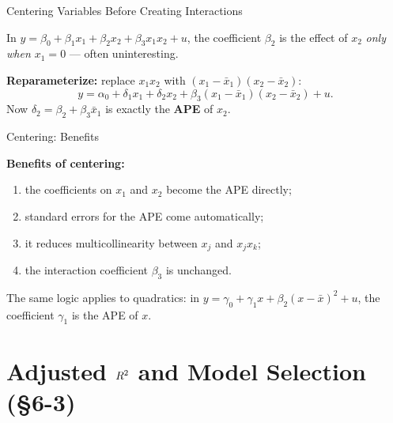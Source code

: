 \documentclass[aspectratio=169, 12pt]{beamer}
\begin{document}
\begin{frame}{Centering Variables Before Creating Interactions}

  In $y = \beta_0 + \beta_1 x_1 + \beta_2 x_2 + \beta_3 x_1 x_2 + u$, the coefficient
  $\beta_2$ is the effect of $x_2$ \emph{only when $x_1 = 0$} --- often uninteresting.

  \medskip

  \textbf{Reparameterize:} replace $x_1 x_2$ with $(x_1 - \bar{x}_1)(x_2 - \bar{x}_2)$:
  \[
    y = \alpha_0 + \delta_1 x_1 + \delta_2 x_2
      + \beta_3 (x_1 - \bar{x}_1)(x_2 - \bar{x}_2) + u .
  \]
  Now $\delta_2 = \beta_2 + \beta_3 \bar{x}_1$ is exactly the \textbf{APE} of $x_2$.

\end{frame}

\begin{frame}{Centering: Benefits}

  \begin{keybox}
    \textbf{Benefits of centering:}
    \begin{enumerate}
      \item the coefficients on $x_1$ and $x_2$ become the APE directly;
      \item standard errors for the APE come automatically;
      \item it reduces multicollinearity between $x_j$ and $x_j x_k$;
      \item the interaction coefficient $\beta_3$ is unchanged.
    \end{enumerate}
  \end{keybox}

  \medskip

  \begin{highlightbox}
    The same logic applies to quadratics: in
    $y = \gamma_0 + \gamma_1 x + \beta_2(x - \bar{x})^2 + u$, the coefficient $\gamma_1$
    is the APE of $x$.
  \end{highlightbox}

\end{frame}

\section{Adjusted $R^2$ and Model Selection (\S6-3)}
\end{document}

